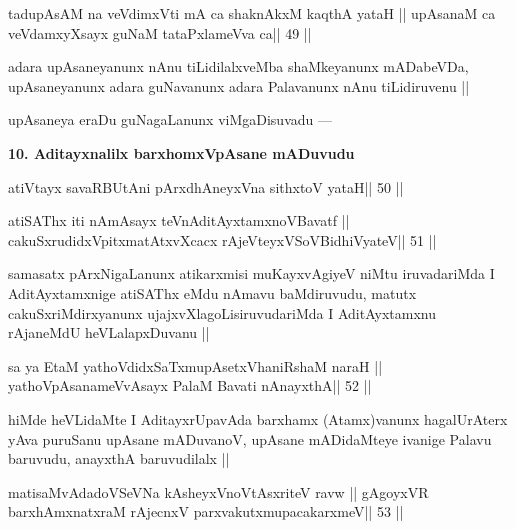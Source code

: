 \begin{shl}
tadupAsAM na veVdimxVti mA ca shaknAkxM kaqthA yataH ||
upAsanaM ca veVdamxyXsayx guNaM tataPxlameVva ca\hfill || 49 ||
\end{shl}

\begin{artha}
adara upAsaneyanunx nAnu tiLidilalxveMba shaMkeyanunx mADabeVDa, upAsaneyanunx adara guNavanunx adara Palavanunx nAnu tiLidiruvenu ||
\end{artha}

\begin{artha}
upAsaneya eraDu guNagaLanunx viMgaDisuvadu ---
\end{artha}


\begin{artha}
{\bf 10. Aditayxnalilx barxhomxVpAsane mADuvudu}
\end{artha} 

\begin{shl}
atiVtayx savaRBUtAni pArxdhAneyxVna sithxtoV yataH\hfill || 50 ||
\end{shl}

\begin{shl}
atiSAThx iti nAmAsayx teVnA\s\s ditAyxtamxnoV\s Bavatf ||
cakuSxrudidxVpitxmatAtxvXcacx rAjeVteyxVSoV\s BidhiVyateV\hfill || 51 ||
\end{shl}

\begin{artha}
samasatx pArxNigaLanunx atikarxmisi muKayxvAgiyeV niMtu iruvadariMda I 
AditAyxtamxnige atiSAThx eMdu nAmavu baMdiruvudu, matutx 
cakuSxriMdirxyanunx ujajxvXlagoLisiruvudariMda I AditAyxtamxnu rAjaneMdU heVLalapxDuvanu ||
\end{artha}

\begin{shl}
sa ya EtaM yathoVdidxSaTxmupAsetxV\s haniRshaM naraH ||
yathoVpAsanameVvAsayx PalaM Bavati nAnayxthA\hfill || 52 ||
\end{shl}

\begin{artha}
hiMde heVLidaMte I AditayxrUpavAda barxhamx (Atamx)vanunx hagalUrAterx yAva puruSanu upAsane mADuvanoV, upAsane mADidaMteye ivanige Palavu baruvudu, anayxthA baruvudilalx ||
\end{artha}

\begin{shl}
matisaMvAdadoVSeVNa kAsheyxVnoVtAsxriteV ravw ||
gAgoyxVR barxhAmxnatxraM rAjecnxV parxvakutxmupacakarxmeV\hfill || 53 ||
\end{shl}

